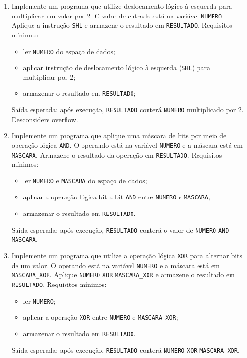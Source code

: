 \documentclass[12pt,a4paper]{article}
\begin{document}
\begin{enumerate}[left=0pt,label=\textbf{Exercício \arabic*:},itemsep=8pt]
\item Implemente um programa que utilize deslocamento lógico à esquerda para multiplicar um valor por 2.
O valor de entrada está na variável \texttt{NUMERO}. Aplique a instrução \texttt{SHL} e armazene o resultado em \texttt{RESULTADO}.
Requisitos mínimos:
\begin{itemize}
	\item ler \texttt{NUMERO} do espaço de dados;
	\item aplicar instrução de deslocamento lógico à esquerda (\texttt{SHL}) para multiplicar por 2;
	\item armazenar o resultado em \texttt{RESULTADO};
\end{itemize}
Saída esperada: após execução, \texttt{RESULTADO} conterá \texttt{NUMERO} multiplicado por 2. Desconsidere overflow.

\item Implemente um programa que aplique uma máscara de bits por meio de operação lógica \texttt{AND}.
O operando está na variável \texttt{NUMERO} e a máscara está em \texttt{MASCARA}. Armazene o resultado da operação em \texttt{RESULTADO}.
Requisitos mínimos:
\begin{itemize}
	\item ler \texttt{NUMERO} e \texttt{MASCARA} do espaço de dados;
	\item aplicar a operação lógica bit a bit \texttt{AND} entre \texttt{NUMERO} e \texttt{MASCARA};
	\item armazenar o resultado em \texttt{RESULTADO}.
\end{itemize}
Saída esperada: após execução, \texttt{RESULTADO} conterá o valor de \texttt{NUMERO} \texttt{AND} \texttt{MASCARA}.

\item Implemente um programa que utilize a operação lógica \texttt{XOR} para alternar bits de um valor.
O operando está na variável \texttt{NUMERO} e a máscara está em \texttt{MASCARA\_XOR}. Aplique \texttt{NUMERO} \texttt{XOR} \texttt{MASCARA\_XOR} e armazene o resultado em \texttt{RESULTADO}.
Requisitos mínimos:
\begin{itemize}
	\item ler \texttt{NUMERO};
	\item aplicar a operação \texttt{XOR} entre \texttt{NUMERO} e \texttt{MASCARA\_XOR};
	\item armazenar o resultado em \texttt{RESULTADO}.
\end{itemize}
Saída esperada: após execução, \texttt{RESULTADO} conterá \texttt{NUMERO} \texttt{XOR} \texttt{MASCARA\_XOR}.


\end{enumerate}
\end{document}
